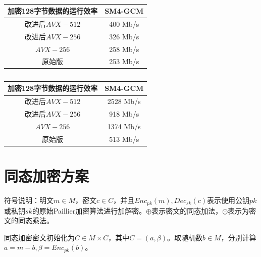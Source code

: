 \documentclass[12pt, a4paper, oneside]{ctexart}
\begin{document}
\begin{table}[htbp]
    \centering  %
    \caption{ }  %
    \label{tab333}  %
    \begin{tabular}{|c|c|}
        \hline
        加密128字节数据的运行效率 & SM4-GCM  \\
        \hline
        改进后$AVX-512$   & 400 Mb/s \\
        \hline
        改进后$AVX-256$   & 326 Mb/s \\
        \hline
        $AVX-256$      & 258 Mb/s \\
        \hline
        原始版            & 253 Mb/s \\
        \hline
    \end{tabular}
\end{table}

\begin{table}[htbp]
    \centering  %
    \caption{ }  %
    \label{tab222}  %
    \begin{tabular}{|c|c|}
        \hline
        加密128字节数据的运行效率 & SM4-GCM   \\
        \hline
        改进后$AVX-512$   & 2528 Mb/s \\
        \hline
        改进后$AVX-256$   & 918 Mb/s  \\
        \hline
        $AVX-256$      & 1374 Mb/s \\
        \hline
        原始版            & 513 Mb/s  \\
        \hline
    \end{tabular}
\end{table}

\newpage


\section{同态加密方案}
符号说明：明文$m\in M$，密文$c\in C$，并且$Enc_{pk} (m),Dec_{sk} (c)$表示使用公钥$pk$或私钥$sk$的原始Paillier加密算法进行加解密。$\oplus$表示密文的同态加法，$\odot$表示为密文的同态乘法。

同态加密密文初始化为$C\in M \times C$，其中$C=\left (a,\beta\right )$。取随机数$b\in M$，分别计算$a=m-b,\beta=Enc_{pk}\left (b\right )$。
\end{document}
